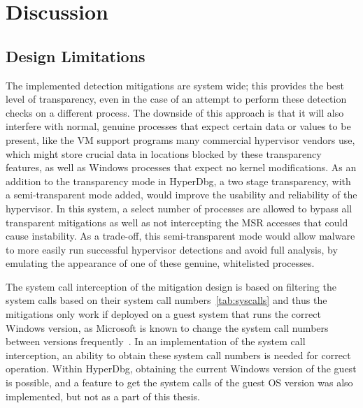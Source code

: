 \section{Discussion}\label{s:discussion}


\subsection{Design Limitations}
The implemented detection mitigations are system wide; this provides the best level of transparency, even in the case of an attempt 
to perform these detection checks on a different process. The downside of this approach is that it will also interfere with normal, 
genuine processes that expect certain data or values to be present, like the VM support programs many commercial hypervisor vendors use, 
which might store crucial data in locations blocked by these transparency features, as well as Windows processes that expect no kernel modifications. 
As an addition to the transparency mode in HyperDbg, a two stage transparency, with a semi-transparent mode added, would improve the usability and reliability of the hypervisor. 
In this system, a select number of processes are allowed to bypass all transparent mitigations as well as not intercepting the MSR accesses that could cause instability. 
As a trade-off, this semi-transparent mode would allow malware to more easily run successful hypervisor detections and avoid full analysis, by emulating the appearance of one 
of these genuine, whitelisted processes.

The system call interception of the mitigation design is based on filtering the system calls based on their system call numbers~\ref{tab:syscalls} and thus the mitigations 
only work if deployed on a guest system that runs the correct Windows version, as Microsoft is known to change the system call numbers between versions 
frequently~\cite{j00ruSyscalls}. In an implementation of the system call interception, an ability to obtain these system call numbers is needed for correct operation.
Within HyperDbg, obtaining the current Windows version of the guest is possible, and a feature to get the system calls of the guest OS version was also implemented, but not as a part of this thesis.

